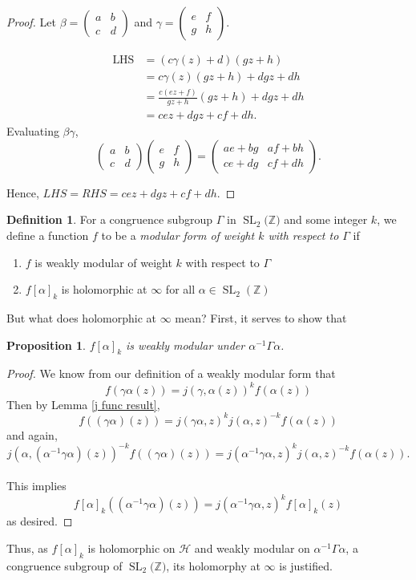 \documentclass{article}
\newtheorem{prop}{Proposition}[section]
\theoremstyle{definition}
\newtheorem{definition}{Definition}[section]
\theoremstyle{definition}
\theoremstyle{definition}
\newcommand{\SL}{\operatorname{SL}}
\newcommand{\Z}{\mathbb{Z}}
\newcommand{\Mabcd}{\begin{pmatrix} a&b\\c&d \end{pmatrix}}
\begin{document}
\begin{proof}
   Let $\beta=\Mabcd$ and $\gamma=\begin{pmatrix}
e & f \\
g & h
\end{pmatrix}$.

\begin{align*}
\text{LHS} &= (c\gamma(z) + d)(gz + h) \\
          &= c\gamma(z)(gz + h) + dgz + dh \\
          &= \frac{c(ez + f)}{gz + h}(gz + h) + dgz + dh \\
          &= cez + dgz + cf + dh.
\end{align*}
Evaluating $\beta\gamma$, \\ \[\begin{pmatrix}
a & b \\
c & d
\end{pmatrix}
\begin{pmatrix}
e & f \\
g & h
\end{pmatrix}
=
\begin{pmatrix}
ae + bg & af + bh \\
ce + dg & cf + dh
\end{pmatrix}.
\]

Hence, $LHS=RHS= cez+dgz+cf+dh$.

\end{proof}
\begin{definition}
    For a congruence subgroup $\Gamma$ in $\SL_2\mathbb(\Z)$ and some integer $k$, we define a function $f$ to be a \emph{modular form of weight $k$ with respect to $\Gamma$} if 
    \begin{enumerate}
        \item $f$ is weakly modular of weight $k$ with respect to $\Gamma$
        \item $f[\alpha]_k$ is holomorphic at $\infty$ for all $\alpha \in \SL_2(\mathbb{Z})$
    \end{enumerate}
    \end{definition}
    
But what does holomorphic at $\infty$ mean? First, it serves to show that 

\begin{prop}
    $f[\alpha]_k$ is weakly modular under $\alpha^{-1}\Gamma\alpha$. 

\end{prop}
\begin{proof}
    We know from our definition of a weakly modular form that $$f(\gamma\alpha(z))=j(\gamma,\alpha(z))^kf(\alpha(z))$$  Then by Lemma \ref{j func result}, 
    $$f((\gamma\alpha)(z))= j(\gamma\alpha,z)^kj(\alpha,z)^{-k}f(\alpha(z))$$ and again, $$j(\alpha,(\alpha^{-1}\gamma\alpha)(z))^{-k}f((\gamma\alpha) (z))=j(\alpha^{-1}\gamma\alpha,z)^kj(\alpha,z)^{-k}f(\alpha(z)).$$
    \\ This implies $$f[\alpha]_k((\alpha^{-1}\gamma\alpha)(z))=j(\alpha^{-1}\gamma\alpha,z)^kf[\alpha]_k(z)$$ as desired.
\end{proof}
    Thus, as $f[\alpha]_k$ is holomorphic on $\mathcal{H}$ and weakly modular on $\alpha^{-1}\Gamma\alpha$, a congruence subgroup of $\SL_2\mathbb(\Z)$, its holomorphy at $\infty$ is justified.
\end{document}
